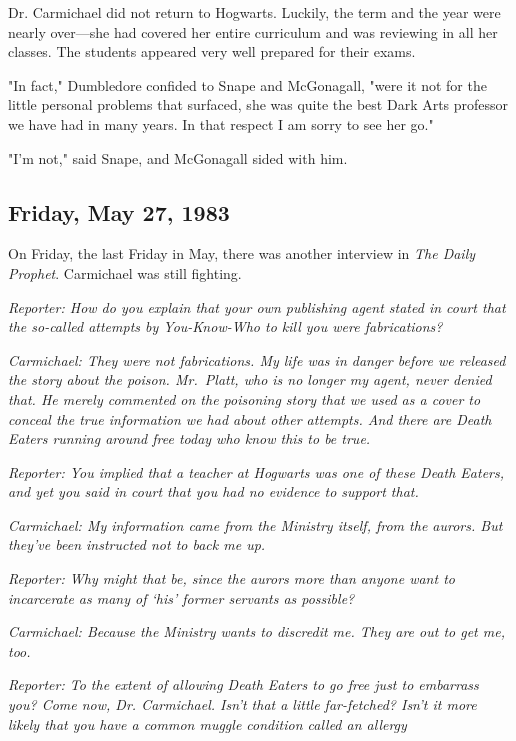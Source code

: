 Dr. Carmichael did not return to Hogwarts. Luckily, the term and the year were nearly over—she had covered her entire curriculum and was reviewing in all her classes. The students appeared very well prepared for their exams.

"In fact," Dumbledore confided to Snape and McGonagall, "were it not for the little personal problems that surfaced, she was quite the best Dark Arts professor we have had in many years. In that respect I am sorry to see her go."

"I'm not," said Snape, and McGonagall sided with him.

\subsection{Friday, May 27, 1983}

On Friday, the last Friday in May, there was another interview in \emph{The Daily Prophet}. Carmichael was still fighting.

\emph{Reporter: How do you explain that your own publishing agent stated in court that the so-called attempts by You-Know-Who to kill you were fabrications?}

\emph{Carmichael: They were not fabrications. My life was in danger before we released the story about the poison. Mr.~Platt, who is no longer my agent, never denied that. He merely commented on the poisoning story that we used as a cover to conceal the true information we had about other attempts. And there are Death Eaters running around free today who know this to be true.}

\emph{Reporter: You implied that a teacher at Hogwarts was one of these Death Eaters, and yet you said in court that you had no evidence to support that.}

\emph{Carmichael: My information came from the Ministry itself, from the aurors. But they've been instructed not to back me up.}

\emph{Reporter: Why might that be, since the aurors more than anyone want to incarcerate as many of `his' former servants as possible?}

\emph{Carmichael: Because the Ministry wants to discredit me. They are out to get me, too.}

\emph{Reporter: To the extent of allowing Death Eaters to go free just to embarrass you? Come now, Dr. Carmichael. Isn't that a little far-fetched? Isn't it more likely that you have a common muggle condition called an allergy{\el}}

